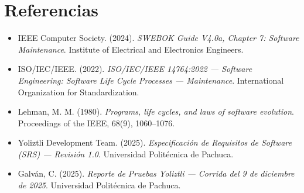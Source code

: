 \documentclass[12pt, openany]{book}
\begin{document}


{
\hypersetup{linkcolor=black}
\tableofcontents
}
\newpage







\chapter*{Referencias}

\begin{itemize}
    \item IEEE Computer Society. (2024). \textit{SWEBOK Guide V4.0a, Chapter 7:
          Software Maintenance}. Institute of Electrical and Electronics Engineers.

    \item ISO/IEC/IEEE. (2022). \textit{ISO/IEC/IEEE 14764:2022 --- Software Engineering:
          Software Life Cycle Processes --- Maintenance}. International Organization
          for Standardization.

    \item Lehman, M. M. (1980). \textit{Programs, life cycles, and laws of software
          evolution}. Proceedings of the IEEE, 68(9), 1060--1076.

    \item Yoliztli Development Team. (2025). \textit{Especificación de Requisitos de
          Software (SRS) --- Revisión 1.0}. Universidad Politécnica de Pachuca.

    \item Galván, C. (2025). \textit{Reporte de Pruebas Yoliztli --- Corrida del
          9 de diciembre de 2025}. Universidad Politécnica de Pachuca.
\end{itemize}
\end{document}
